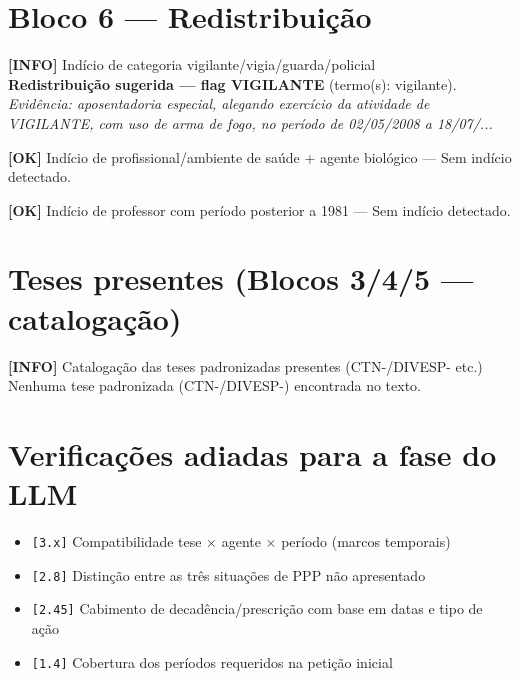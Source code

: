 \documentclass[12pt,a4paper]{article}
\newcommand{\statusOK}[1]{\textcolor{corOK}{\textbf{[OK]}} #1}
\newcommand{\statusINFO}[1]{\textcolor{corINFO}{\textbf{[INFO]}} #1}
\begin{document}
\section{Bloco 6 --- Redistribuição}

\statusINFO{Indício de categoria vigilante/vigia/guarda/policial}\\
\textcolor{corVERIFICAR}{\textbf{Redistribuição sugerida --- flag VIGILANTE}} (termo(s): vigilante).
\\
\textit{Evidência: aposentadoria especial, alegando exercício da atividade de VIGILANTE, com uso de arma de fogo, no período de 02/05/2008 a 18/07/...}

\medskip
\statusOK{Indício de profissional/ambiente de saúde + agente biológico} --- Sem indício detectado.

\medskip
\statusOK{Indício de professor com período posterior a 1981} --- Sem indício detectado.

\section{Teses presentes (Blocos 3/4/5 --- catalogação)}

\statusINFO{Catalogação das teses padronizadas presentes (CTN-/DIVESP- etc.)}\\
Nenhuma tese padronizada (CTN-/DIVESP-) encontrada no texto.

\section{Verificações adiadas para a fase do LLM}

\begin{itemize}
  \item \texttt{[3.x]} Compatibilidade tese × agente × período (marcos temporais)
  \item \texttt{[2.8]} Distinção entre as três situações de PPP não apresentado
  \item \texttt{[2.45]} Cabimento de decadência/prescrição com base em datas e tipo de ação
  \item \texttt{[1.4]} Cobertura dos períodos requeridos na petição inicial
\end{itemize}
\end{document}
